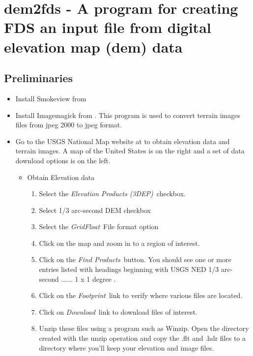 \section{dem2fds - A program for creating FDS an input file from digital elevation map (dem) data}

\subsection{Preliminaries}

\begin{itemize}
\item Install Smokeview from 
\item Install Imagemagick from .
This program is used to convert terrain images files from jpeg 2000 to jpeg format.

\item Go to the USGS National Map website at to obtain elevation data and terrain images.
A map of the United States is on the right and a set of data download options is on the left.
\begin{itemize}
\item Obtain Elevation data

\begin{enumerate}
\item Select the {\em Elevation Products (3DEP)}\ checkbox.
\item Select 1/3 arc-second DEM checkbox
\item Select the {\em GridFloat}\ File format option
\item Click on the map and zoom in to a region of interest.
\item Click on the {\em Find Products}\ button.  You should see one or more
entries listed with headings beginning with
USGS NED 1/3 arc-second ...... 1 x 1 degree .
\item Click on the {\em Footprint}\ link to verify where various files are located.
\item Click on {\em Download}\ link to download files of interest.
\item Unzip these files using a program such as Winzip. Open the directory created with the unzip operation and
copy the .flt and .hdr files to a directory where you'll keep your elevation and image files.
\end{enumerate}


\end{itemize}
\end{itemize}

